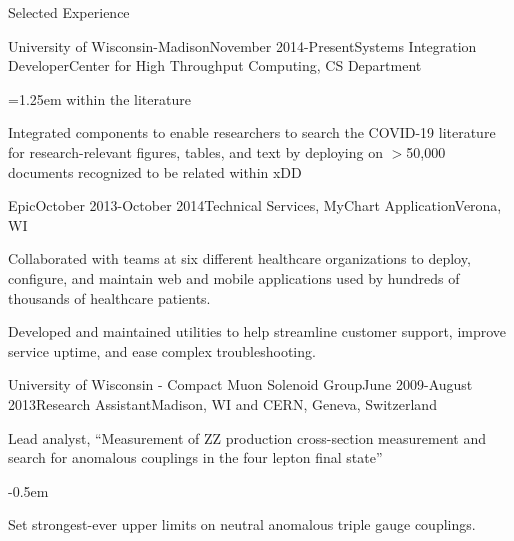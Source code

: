 \documentclass{resume} %
\begin{document}
\begin{rSection}{Selected Experience}
\begin{rSubsection}{University of Wisconsin-Madison}{November
    2014-Present}{Systems Integration Developer}{Center for High Throughput
    Computing, CS Department}
\begin{list}{}{\leftmargin=1.5em}
\begin{itemize}{}{\leftmargin=1.25em}
          within the literature
          \end{itemize}
      \item Integrated components to enable researchers to search the COVID-19 literature for
          research-relevant figures, tables, and text by deploying on
          $>$50,000 documents recognized to be related within xDD
    \end{list}
\end{rSubsection}

\begin{rSubsection}{Epic}{October 2013-October 2014}{Technical Services, MyChart
Application}{Verona, WI}
\item Collaborated with teams at six different healthcare organizations to
deploy, configure, and maintain web and mobile applications used by
hundreds of thousands of healthcare patients.
\item Developed and maintained utilities to help streamline customer support,
improve service uptime, and ease complex troubleshooting.
\end{rSubsection}

\begin{rSubsection}{University of Wisconsin - Compact Muon Solenoid Group}{June
2009-August 2013}{Research Assistant}{Madison, WI and CERN, Geneva, Switzerland}

\item Lead analyst, ``Measurement of ZZ production cross-section measurement and
search for anomalous couplings in the four lepton final state''
    \begin{list}{}{\leftmargin=1.5em} 
      \itemsep -0.5em \vspace{-0.5em} %
      \item Set strongest-ever upper limits on neutral anomalous triple gauge
      couplings.
    \end{list}



\end{rSubsection}
\end{rSection}
\end{document}
